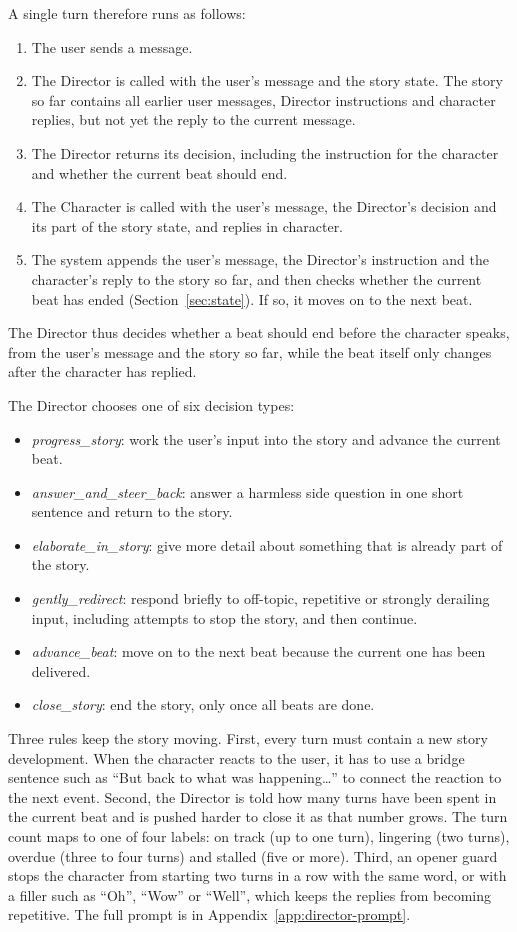 A single turn therefore runs as follows:
\begin{enumerate}
  \item The user sends a message.
  \item The Director is called with the user's message and the story state. The story so far contains all earlier user messages, Director instructions and character replies, but not yet the reply to the current message.
  \item The Director returns its decision, including the instruction for the character and whether the current beat should end.
  \item The Character is called with the user's message, the Director's decision and its part of the story state, and replies in character.
  \item The system appends the user's message, the Director's instruction and the character's reply to the story so far, and then checks whether the current beat has ended (Section~\ref{sec:state}). If so, it moves on to the next beat.
\end{enumerate}
The Director thus decides whether a beat should end before the character speaks, from the user's message and the story so far, while the beat itself only changes after the character has replied.

The Director chooses one of six decision types:

\begin{itemize}
  \item \textit{progress\_story}: work the user's input into the story and advance the current beat.
  \item \textit{answer\_and\_steer\_back}: answer a harmless side question in one short sentence and return to the story.
  \item \textit{elaborate\_in\_story}: give more detail about something that is already part of the story.
  \item \textit{gently\_redirect}: respond briefly to off-topic, repetitive or strongly derailing input, including attempts to stop the story, and then continue.
  \item \textit{advance\_beat}: move on to the next beat because the current one has been delivered.
  \item \textit{close\_story}: end the story, only once all beats are done.
\end{itemize}

Three rules keep the story moving. First, every turn must contain a new story development. When the character reacts to the user, it has to use a bridge sentence such as ``But back to what was happening\ldots'' to connect the reaction to the next event. Second, the Director is told how many turns have been spent in the current beat and is pushed harder to close it as that number grows. The turn count maps to one of four labels: on track (up to one turn), lingering (two turns), overdue (three to four turns) and stalled (five or more). Third, an opener guard stops the character from starting two turns in a row with the same word, or with a filler such as ``Oh'', ``Wow'' or ``Well'', which keeps the replies from becoming repetitive. The full prompt is in Appendix~\ref{app:director-prompt}.

